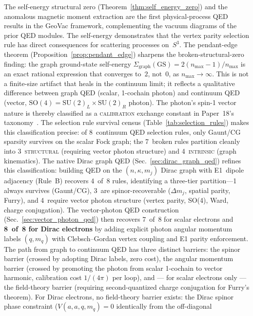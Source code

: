 \documentclass[11pt]{article}
\begin{document}
The self-energy structural zero (Theorem~\ref{thm:self_energy_zero})
and the anomalous magnetic moment extraction are the first
physical-process QED results in the GeoVac framework, complementing
the vacuum diagrams of the prior QED modules.  The self-energy
demonstrates that the vertex parity selection rule has direct
consequences for scattering processes on~$S^3$.
The pendant-edge theorem (Proposition~\ref{prop:pendant_edge})
sharpens the broken-structural-zero finding: the graph ground-state
self-energy $\Sigma_{\mathrm{graph}}(\mathrm{GS}) = 2(n_{\max}-1)/n_{\max}$
is an exact rational expression that converges to~$2$, not~$0$, as
$n_{\max} \to \infty$.  This is not a finite-size artifact that heals
in the continuum limit; it reflects a qualitative difference between
graph QED (scalar, 1-cochain photon) and continuum QED (vector,
$\mathrm{SO}(4) = \mathrm{SU}(2)_L \times \mathrm{SU}(2)_R$ photon).
The photon's spin-1 vector nature is thereby classified as a
\textsc{calibration} exchange constant in Paper~18's
taxonomy~\cite{paper18}.  The selection rule survival census
(Table~\ref{tab:selection_rules}) makes this classification precise:
of 8~continuum QED selection rules, only Gaunt/CG sparsity survives on
the scalar Fock graph; the 7~broken rules partition cleanly into
3~\textsc{structural} (requiring vector photon structure) and
4~\textsc{intrinsic} (graph kinematics).  The native Dirac graph QED
(Sec.~\ref{sec:dirac_graph_qed}) refines this classification: building
QED on the $(n, \kappa, m_j)$ Dirac graph with E1~dipole adjacency
(Rule~B) recovers 4~of~8 rules, identifying a three-tier partition---1
always survives (Gaunt/CG), 3~are spinor-recoverable ($\Delta m_j$,
spatial parity, Furry), and 4~require vector photon structure (vertex
parity, SO(4), Ward, charge conjugation).  The vector-photon QED
construction (Sec.~\ref{sec:vector_photon_qed}) then recovers 7~of~8
for scalar electrons and \textbf{8~of~8 for Dirac electrons}
by adding explicit photon angular momentum labels $(q, m_q)$ with
Clebsch--Gordan vertex coupling and E1 parity enforcement.  The path
from graph to continuum QED has three distinct barriers: the spinor
barrier (crossed by adopting Dirac labels, zero cost), the angular
momentum barrier (crossed by promoting the photon from scalar 1-cochain
to vector harmonic, calibration cost $1/(4\pi)$ per loop), and ---
for scalar electrons only --- the field-theory barrier (requiring
second-quantized charge conjugation for Furry's theorem).  For Dirac
electrons, no field-theory barrier exists: the Dirac spinor phase
constraint ($V(a, a, q, m_q) = 0$ identically from the off-diagonal
\end{document}
